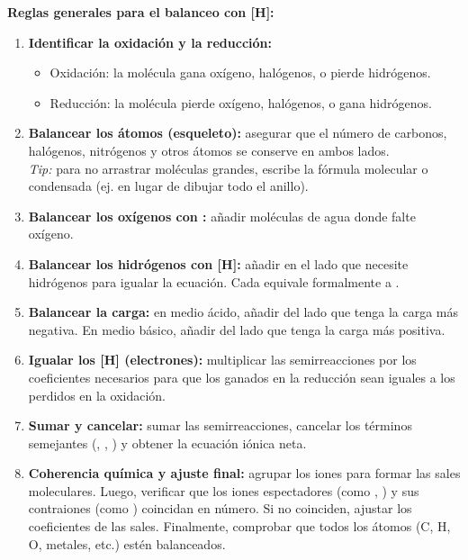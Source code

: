 \textbf{Reglas generales para el balanceo con [H]:}
\begin{enumerate}
    \item \textbf{Identificar la oxidación y la reducción:} 
    \begin{itemize}
        \item Oxidación: la molécula gana oxígeno, halógenos, o pierde hidrógenos.
        \item Reducción: la molécula pierde oxígeno, halógenos, o gana hidrógenos.
    \end{itemize}
    
    \item \textbf{Balancear los átomos (esqueleto):} asegurar que el número de carbonos, halógenos, nitrógenos y otros átomos se conserve en ambos lados. \\
    \textit{Tip:} para no arrastrar moléculas grandes, escribe la fórmula molecular o condensada (ej.  en lugar de dibujar todo el anillo).
    
    \item \textbf{Balancear los oxígenos con :} añadir moléculas de agua donde falte oxígeno.
    
    \item \textbf{Balancear los hidrógenos con [H]:} añadir \ce{[H]} en el lado que necesite hidrógenos para igualar la ecuación. Cada \ce{[H]} equivale formalmente a .
    
    \item \textbf{Balancear la carga:} en medio ácido, añadir  del lado que tenga la carga más negativa. En medio básico, añadir  del lado que tenga la carga más positiva.
    
    \item \textbf{Igualar los [H] (electrones):} multiplicar las semirreacciones por los coeficientes necesarios para que los \ce{[H]} ganados en la reducción sean iguales a los perdidos en la oxidación.
    
    \item \textbf{Sumar y cancelar:} sumar las semirreacciones, cancelar los términos semejantes (\ce{[H]}, , ) y obtener la ecuación iónica neta.
    
    \item \textbf{Coherencia química y ajuste final:} agrupar los iones para formar las sales moleculares. Luego, verificar que los iones espectadores (como , ) y sus contraiones (como ) coincidan en número. Si no coinciden, ajustar los coeficientes de las sales. Finalmente, comprobar que todos los átomos (C, H, O, metales, etc.) estén balanceados.
\end{enumerate}

